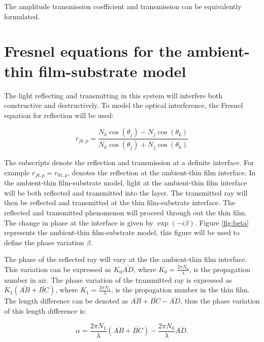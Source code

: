 \documentclass[MasterThesisMain.tex]{subfiles}
\begin{document}
The amplitude transmission coefficient and transmission can be equivalently formulated.

\section{Fresnel equations for the ambient-thin film-substrate model}\label{ch:fresnel2lay}
The light reflecting and transmitting in this system will interfere both constructive and destructively. To model the optical interference, the Fresnel equation for reflection will be used:

\begin{equation}
r_{jk,p} = \frac{N_k\cos(\theta_j)-N_j\cos(\theta_k)}{N_k\cos(\theta_j)+N_j\cos(\theta_k)} %
\end{equation}

The subscripts denote the reflection and transmission at a definite interface. For example $r_{jk,p} = r_{01,p}$, denotes the reflection at the ambient-thin film interface. In the ambient-thin film-substrate model, light at the ambient-thin film interface will be both reflected and transmitted into the layer. The transmitted ray will then be reflected and transmitted at the thin film-substrate interface. The reflected and transmitted phenomenon will proceed through out the thin film. The change in phase at the interface is given by $\exp(-i\beta)$. Figure \ref{fig:beta} represents the ambient-thin film-substrate model, this figure will be used to define the phase variation $\beta$.

The phase of the reflected ray will vary at the the ambient-thin film interface. This variation can be expressed as $K_0\bar{AD}$, where $K_0=\frac{2\pi N_0}{\lambda}$, is the propagation number in air. The phase variation of the transmitted ray is expressed as $K_1(\bar{AB} + \bar{BC})$, where $K_1=\frac{2\pi N_1}{\lambda}$, is the propagation number in the thin film. The length difference can be denoted as $\bar{AB} + \bar{BC} - \bar{AD}$, thus the phase variation of this length difference is:

\begin{equation}\label{eq:phasealpha}
\alpha = \frac{2\pi N_1}{\lambda}(\bar{AB} + \bar{BC}) - \frac{2\pi N_0}{\lambda}\bar{AD}.
\end{equation}
\end{document}
